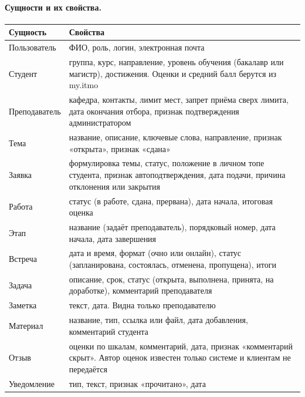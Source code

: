 \documentclass[a4paper,12pt]{article}
\begin{document}
\paragraph{Сущности и их свойства.}
\begin{center}
\small
\begin{longtable}{|p{3.2cm}|p{11.6cm}|}
\hline
\textbf{Сущность} & \textbf{Свойства}\\ \hline
\endhead
Пользователь & ФИО, роль, логин, электронная почта\\ \hline
Студент & группа, курс, направление, уровень обучения (бакалавр или магистр), достижения. Оценки и средний балл берутся из my.itmo\\ \hline
Преподаватель & кафедра, контакты, лимит мест, запрет приёма сверх лимита, дата окончания отбора, признак подтверждения администратором\\ \hline
Тема & название, описание, ключевые слова, направление, признак «открыта», признак «сдана»\\ \hline
Заявка & формулировка темы, статус, положение в личном топе студента, признак автоподтверждения, дата подачи, причина отклонения или закрытия\\ \hline
Работа & статус (в работе, сдана, прервана), дата начала, итоговая оценка\\ \hline
Этап & название (задаёт преподаватель), порядковый номер, дата начала, дата завершения\\ \hline
Встреча & дата и время, формат (очно или онлайн), статус (запланирована, состоялась, отменена, пропущена), итоги\\ \hline
Задача & описание, срок, статус (открыта, выполнена, принята, на доработке), комментарий преподавателя\\ \hline
Заметка & текст, дата. Видна только преподавателю\\ \hline
Материал & название, тип, ссылка или файл, дата добавления, комментарий студента\\ \hline
Отзыв & оценки по шкалам, комментарий, дата, признак «комментарий скрыт». Автор оценок известен только системе и клиентам не передаётся\\ \hline
Уведомление & тип, текст, признак «прочитано», дата\\ \hline
\end{longtable}
\end{center}
\end{document}
